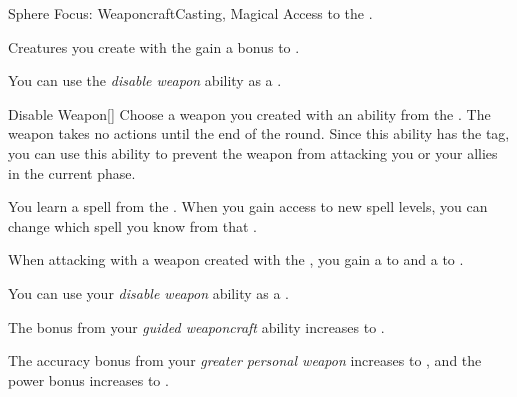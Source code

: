     \begin{feat}{Sphere Focus: Weaponcraft}{Casting, Magical}
        \featpre Access to the  .

         Creatures you create with the   gain a  bonus to .

         You can use the \textit{disable weapon} ability as a .
        \begin{freeability}{Disable Weapon}[]
            Choose a weapon you created with an ability from the  .
            The weapon takes no actions until the end of the round.
            Since this ability has the  tag, you can use this ability to prevent the weapon from attacking you or your allies in the current phase.
        \end{freeability}

         You learn a spell from the  .
        When you gain access to new spell levels, you can change which spell you know from that .

         When attacking with a weapon created with the  , you gain a   to  and a   to .

         You can use your \textit{disable weapon} ability as a .

         The bonus from your \textit{guided weaponcraft} ability increases to .

         The accuracy bonus from your \textit{greater personal weapon} increases to , and the power bonus increases to .
    \end{feat}

